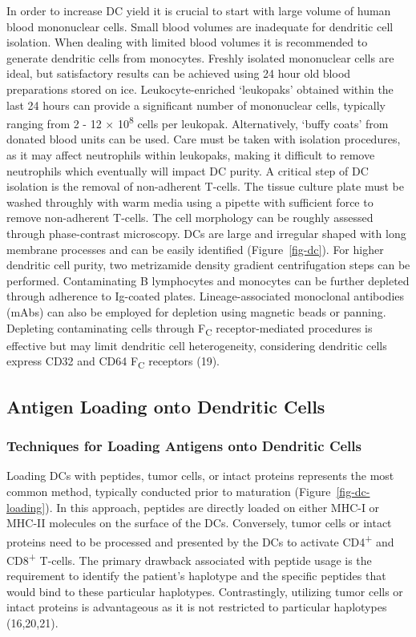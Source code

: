 \documentclass[
]{article}
\begin{document}
In order to increase DC yield it is crucial to start with large volume
of human blood mononuclear cells. Small blood volumes are inadequate for
dendritic cell isolation. When dealing with limited blood volumes it is
recommended to generate dendritic cells from monocytes. Freshly isolated
mononuclear cells are ideal, but satisfactory results can be achieved
using 24 hour old blood preparations stored on ice. Leukocyte-enriched
`leukopaks' obtained within the last 24 hours can provide a significant
number of mononuclear cells, typically ranging from 2 - 12 ×
10\textsuperscript{8} cells per leukopak. Alternatively, `buffy coats'
from donated blood units can be used. Care must be taken with isolation
procedures, as it may affect neutrophils within leukopaks, making it
difficult to remove neutrophils which eventually will impact DC purity.
A critical step of DC isolation is the removal of non-adherent T-cells.
The tissue culture plate must be washed throughly with warm media using
a pipette with sufficient force to remove non-adherent T-cells. The cell
morphology can be roughly assessed through phase-contrast microscopy.
DCs are large and irregular shaped with long membrane processes and can
be easily identified (Figure~\ref{fig-dc}). For higher dendritic cell
purity, two metrizamide density gradient centrifugation steps can be
performed. Contaminating B lymphocytes and monocytes can be further
depleted through adherence to Ig-coated plates. Lineage-associated
monoclonal antibodies (mAbs) can also be employed for depletion using
magnetic beads or panning. Depleting contaminating cells through
F\textsubscript{C} receptor-mediated procedures is effective but may
limit dendritic cell heterogeneity, considering dendritic cells express
CD32 and CD64 F\textsubscript{C} receptors (19).

\subsection{Antigen Loading onto Dendritic
Cells}\label{antigen-loading-onto-dendritic-cells}

\subsubsection{Techniques for Loading Antigens onto Dendritic
Cells}\label{techniques-for-loading-antigens-onto-dendritic-cells}

Loading DCs with peptides, tumor cells, or intact proteins represents
the most common method, typically conducted prior to maturation
(Figure~\ref{fig-dc-loading}). In this approach, peptides are directly
loaded on either MHC-I or MHC-II molecules on the surface of the DCs.
Conversely, tumor cells or intact proteins need to be processed and
presented by the DCs to activate CD4\textsuperscript{+} and
CD8\textsuperscript{+} T-cells. The primary drawback associated with
peptide usage is the requirement to identify the patient's haplotype and
the specific peptides that would bind to these particular haplotypes.
Contrastingly, utilizing tumor cells or intact proteins is advantageous
as it is not restricted to particular haplotypes (16,20,21).
\end{document}

